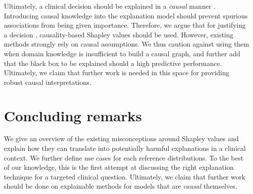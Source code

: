 \documentclass[nohyperref]{article}
\theoremstyle{plain}
\theoremstyle{definition}
\theoremstyle{remark}
\begin{document}
Ultimately, a clinical decision should be explained in a \emph{causal} manner \cite{tonekaboni2019clinicians}. Introducing causal knowledge into the explanation model should prevent spurious associations from being given importance. Therefore, we argue that for justifying a decision \cite{adadi2018peeking}, causality-based Shapley values \cite{frye2019asymmetric, heskes2020causal, wang2021shapley} should be used. However, existing methods strongly rely on causal assumptions. We thus caution against using them when domain knowledge is insufficient to build a causal graph, and further add that the black box to be explained should a high predictive performance. Ultimately, we claim that further work is needed in this space for providing robust causal interpretations.

\section{Concluding remarks}
\label{sec:discussion}
We give an overview of the existing misconceptions around Shapley values and explain how they can translate into potentially harmful explanations in a clinical context. We further define use cases for each reference distributions. To the best of our knowledge, this is the first attempt at discussing the right explanation technique for a targeted clinical question. Ultimately, we claim that further work should be done on explainable methods for models that are \emph{causal} themselves.


\end{document}
